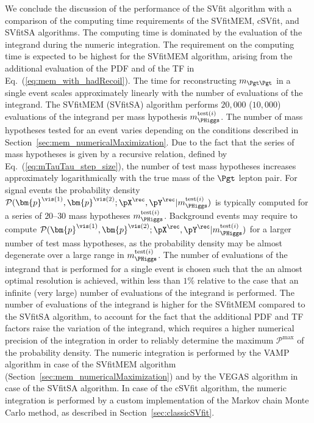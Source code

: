 We conclude the discussion of the performance of the SVfit algorithm
with a comparison of the computing time requirements of the SVfitMEM,
cSVfit, and SVfitSA algorithms.
The computing time is dominated by the
evaluation of the integrand during the numeric integration.
The requirement on the computing time is expected to be
highest for the SVfitMEM algorithm, arising from the additional evaluation of the PDF and of the TF in Eq.~(\ref{eq:mem_with_hadRecoil}).
The time for reconstructing $m_{\Pgt\Pgt}$ in a single event scales approximately linearly
with the number of evaluations of the integrand.
The SVfitMEM (SVfitSA) algorithm performs $20,000$ ($10,000$)
evaluations of the integrand per mass hypothesis
$m_{\PHiggs}^{\textrm{test}(i)}$.
The number of mass hypotheses tested for an event varies depending on the
conditions described in Section~\ref{sec:mem_numericalMaximization}.
Due to the fact that the series of mass hypotheses is given by a
recursive relation,
defined by Eq.~(\ref{eq:mTauTau_step_size}), the number of test mass
hypotheses increases approximately logarithmically with the
true mass of the $\Pgt$ lepton pair. 
For signal events the probability density $\mathcal{P}(\bm{p}^{\vis(1)},\bm{p}^{\vis(2)};\pX^{\rec},\pY^{\rec}|m_{\PHiggs}^{\textrm{test}(i)})$
is typically computed for a series of $20$--$30$ mass hypotheses $m_{\PHiggs}^{\textrm{test}(i)}$.
Background events may require to compute $\mathcal{P}(\bm{p}^{\vis(1)},\bm{p}^{\vis(2)};\pX^{\rec},\pY^{\rec}|m_{\PHiggs}^{\textrm{test}(i)})$ for a larger number of test mass hypotheses,
as the probability density may be almost degenerate over a large range in $m_{\PHiggs}^{\textrm{test}(i)}$.
The number of evaluations of the integrand that is performed for a single event is chosen such that the
an almost optimal resolution is achieved, within less than $1\%$ relative to
the case that an infinite (very large) number of evaluations of the
integrand is performed.
The number of evaluations of the integrand is higher for the SVfitMEM
compared to the SVfitSA algorithm, to account for the fact that the additional PDF and TF factors
raise the variation of the integrand,
which requires a higher numerical precision of the integration in
order to reliably determine the maximum $\mathcal{P}^{\textrm{max}}$ of the probability density.
The numeric integration is performed by the VAMP algorithm in case of
the SVfitMEM algorithm (\cf Section~\ref{sec:mem_numericalMaximization}) and by the VEGAS algorithm
in case of the SVfitSA algorithm.
In case of the cSVfit algorithm, the numeric integration is performed
by a custom implementation of the Markov chain Monte Carlo method, as described in Section~\ref{sec:classicSVfit}.
